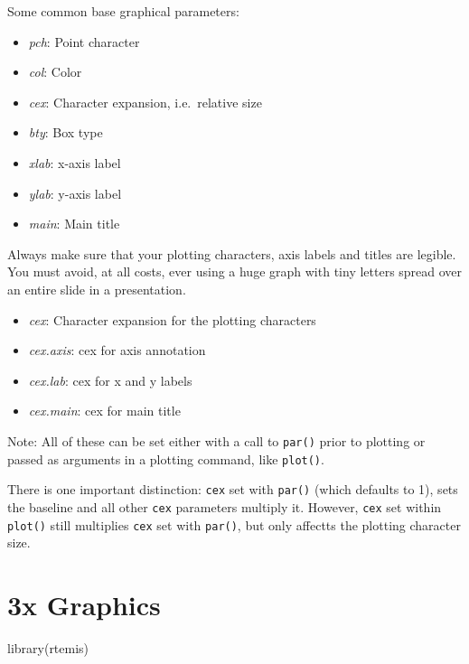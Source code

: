 \documentclass[
]{book}
\newenvironment{Shaded}{\begin{snugshade}}{\end{snugshade}}
\newcommand{\FunctionTok}[1]{\textcolor[rgb]{0.00,0.00,0.00}{#1}}
\newcommand{\NormalTok}[1]{#1}
\providecommand{\tightlist}{%
  \setlength{\itemsep}{0pt}\setlength{\parskip}{0pt}}
\begin{document}
Some common base graphical parameters:

\begin{itemize}
\tightlist
\item
  \emph{pch}: Point character
\item
  \emph{col}: Color
\item
  \emph{cex}: Character expansion, i.e.~relative size
\item
  \emph{bty}: Box type
\item
  \emph{xlab}: x-axis label
\item
  \emph{ylab}: y-axis label
\item
  \emph{main}: Main title
\end{itemize}

Always make sure that your plotting characters, axis labels and titles are legible. You must avoid, at all costs, ever using a huge graph with tiny letters spread over an entire slide in a presentation.

\begin{itemize}
\tightlist
\item
  \emph{cex}: Character expansion for the plotting characters
\item
  \emph{cex.axis}: cex for axis annotation
\item
  \emph{cex.lab}: cex for x and y labels
\item
  \emph{cex.main}: cex for main title
\end{itemize}

Note: All of these can be set either with a call to \texttt{par()} prior to plotting or passed as arguments in a plotting command, like \texttt{plot()}.

There is one important distinction: \texttt{cex} set with \texttt{par()} (which defaults to 1), sets the baseline and all other \texttt{cex} parameters multiply it. However, \texttt{cex} set within \texttt{plot()} still multiplies \texttt{cex} set with \texttt{par()}, but only affectts the plotting character size.

\hypertarget{graphics3x}{%
\chapter{3x Graphics}\label{graphics3x}}

\begin{Shaded}
\begin{Highlighting}[]
\FunctionTok{library}\NormalTok{(rtemis)}
\end{Highlighting}
\end{Shaded}
\end{document}
